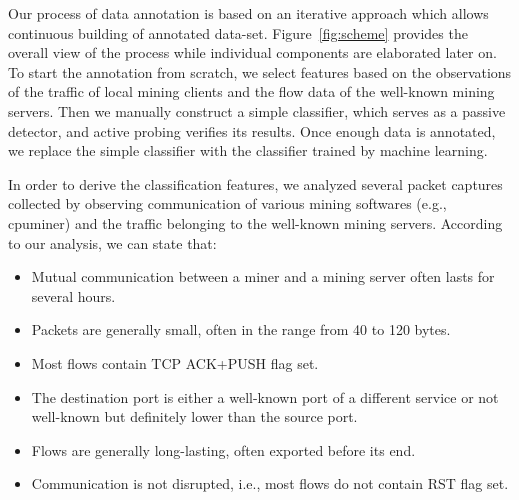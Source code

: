\documentclass[preprint,12pt,3p]{elsarticle}
\begin{document}
Our process of data annotation is based on an iterative approach which allows continuous building of annotated data-set. 
Figure~\ref{fig:scheme} provides the overall view of the process while individual components are elaborated later on.
To start the annotation from scratch, we select features based on the observations of the traffic of local mining clients and the flow data of the well-known mining servers. 
Then we manually construct a simple classifier, which serves as a passive detector, and active probing verifies its results.
Once enough data is annotated, we replace the simple classifier with the classifier trained by machine learning.


In order to derive the classification features, we analyzed several packet captures collected by observing communication of various mining softwares (e.g., cpuminer) and the traffic belonging to the well-known mining servers.
According to our analysis, we can state that:
\begin{itemize}
\item Mutual communication between a miner and a mining server often lasts for several hours.
\item Packets are generally small, often in the range from 40 to 120 bytes.
\item Most flows contain TCP ACK+PUSH flag set.
\item The destination port is either a well-known port of a different service or not well-known but definitely lower than the source port.
\item Flows are generally long-lasting, often exported before its end.
\item Communication is not disrupted, i.e., most flows do not contain RST flag set.
\end{itemize}
\end{document}
